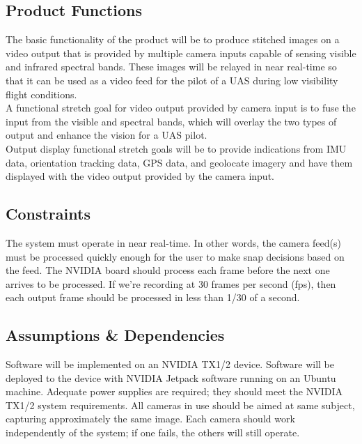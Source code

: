 \documentclass[letterpaper,10pt,serif,draftclsnofoot,onecolumn,compsoc,titlepage]{IEEEtran}
\begin{document}
\subsection{Product Functions}

The basic functionality of the product will be to produce stitched images on a video 
output that is provided by multiple camera inputs capable of sensing visible and 
infrared spectral bands. These images will be relayed in near real-time so that it 
can be used as a video feed for the pilot of a UAS during low visibility flight 
conditions. \\

A functional stretch goal for video output provided by camera input is to fuse the 
input from the visible and spectral bands, which will overlay the two types of output 
and enhance the vision for a UAS pilot. \\

Output display functional stretch goals will be to provide indications from IMU data, 
orientation tracking data, GPS data, and geolocate imagery and have them displayed 
with the video output provided by the camera input. \\

\subsection{Constraints}

The system must operate in near real-time. In other words, the camera feed(s) must be 
processed quickly enough for the user to make snap decisions based on the feed. The 
NVIDIA board should process each frame before the next one arrives to be processed. 
If we’re recording at 30 frames per second (fps), then each output frame should be 
processed in less than 1/30 of a second.\\

\subsection{Assumptions \& Dependencies}


Software will be implemented on an NVIDIA TX1/2 device. Software will be deployed to the device with NVIDIA Jetpack software running on an Ubuntu machine. Adequate power supplies are required; they should meet the NVIDIA TX1/2 system requirements. All cameras in use should be aimed at same subject, capturing approximately the same image. Each camera should work independently of the system; if one fails, the others will still operate.
\end{document}
